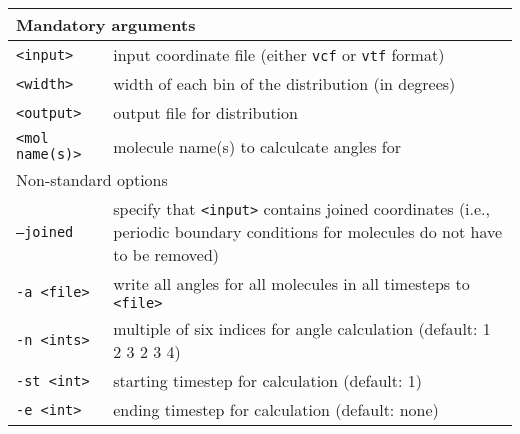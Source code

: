\noindent
\begin{longtable}{p{}p{}}
  \toprule
  \multicolumn{2}{l}{Mandatory arguments} \\
  \midrule
  \texttt{<input>} & input coordinate file (either \texttt{vcf} or
    \texttt{vtf} format) \\
  \texttt{<width>} & width of each bin of the distribution (in degrees) \\
  \texttt{<output>} & output file for distribution \\
  \texttt{<mol name(s)>} & molecule name(s) to calculcate angles for \\
  \toprule
  \multicolumn{2}{l}{Non-standard options} \\
  \midrule
  \texttt{--joined} & specify that \texttt{<input>} contains joined
    coordinates (i.e., periodic boundary conditions for molecules do not
    have to be removed) \\
  \texttt{-a <file>} & write all angles for all molecules in all timesteps
    to \texttt{<file>} \\
  \texttt{-n  <ints>} & multiple of six indices for angle calculation
    (default: 1 2 3 2 3 4) \\
  \texttt{-st <int>} & starting timestep for calculation (default: 1) \\
  \texttt{-e <int>} & ending timestep for calculation (default: none) \\
  \bottomrule
\end{longtable}

